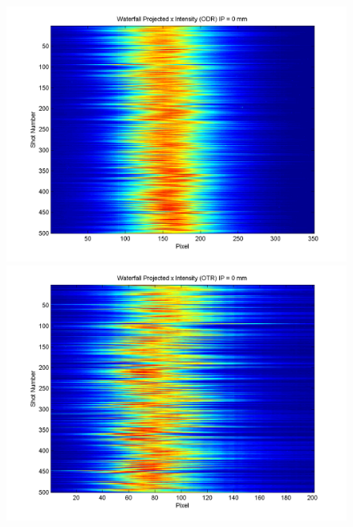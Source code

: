 \documentclass[12pt]{article}
\begin{document}
\begin{figure}
\begin{center}
\includegraphics[scale=0.5]{Figures/ProjX_wfall_ODR_0.PNG}
\includegraphics[scale=0.5]{Figures/ProjX_wfall_OTR_0.PNG}
\caption{}
\end{center}
\end{figure}
\end{document}
